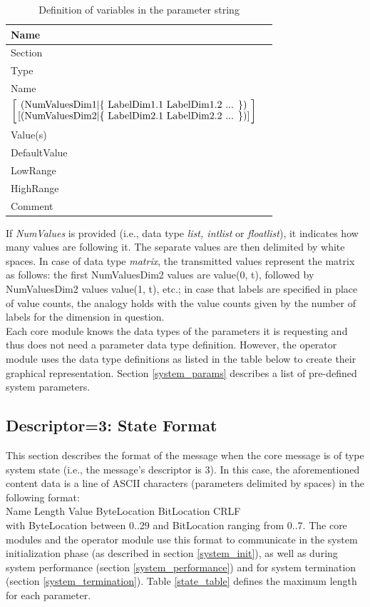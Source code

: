 \documentclass[letterpaper,oneside,12pt]{book}
\begin{document}
\begin{table}[ht]
 \centering
 \begin{tabular}{|l|l|}
  \hline
  \textbf{Name} \\
  \hline
  Section \\
  \hline
  Type \\
  \hline
  Name \\
  \hline
  ${\left[
    \mbox{(NumValuesDim1$\mid$\{ LabelDim1.1 LabelDim1.2 ... \})}
    \atop
    \mbox{[(NumValuesDim2$\mid$\{ LabelDim2.1 LabelDim2.2 ... \})]}
    \right]}$ \\
  \hline
  Value(s) \\
  \hline
  DefaultValue \\
  \hline
  LowRange \\
  \hline
  HighRange \\
  \hline
  Comment \\
  \hline
 \end{tabular}
 \caption{Definition of variables in the parameter string}
 \label{tab:parametervariables}
\end{table}   

If \textit{NumValues} is provided (i.e., data type \textit{list, intlist} or 
\textit{floatlist}), it indicates how many values are following it. The separate 
values are then delimited by white spaces. In case of data type \textit{matrix}, 
the transmitted values represent the matrix as follows: the first NumValuesDim2 
values are value(0, t), followed by NumValuesDim2 values value(1, t), etc.;
in case that labels are specified in place of value counts, the analogy holds
with the value counts given by the number of labels for the dimension in
question.\\

Each core module knows the data types of the parameters it is requesting and 
thus does not need a parameter data type definition. However, the operator 
module uses the data type definitions as listed in the table below to create 
their graphical representation. Section \ref{system_params} describes a list of 
pre-defined system parameters.


\subsection{Descriptor=3: State Format}
\label{state_format}

This section describes the format of the message when the core message is of 
type system state (i.e., the message's descriptor is 3). In this case, the 
aforementioned content data is a line of ASCII characters (parameters
delimited by spaces) in the following format:
\\[2ex]
Name Length Value ByteLocation BitLocation CRLF
\\[2ex]
with ByteLocation between 0..29 and BitLocation ranging from 0..7. The core 
modules and the operator module use this format to communicate in the system 
initialization phase (as described in section \ref{system_init}), as well as 
during system performance (section \ref{system_performance}) and for system 
termination (section \ref{system_termination}). Table \ref{state_table} 
defines the maximum length for each parameter.
\end{document}
